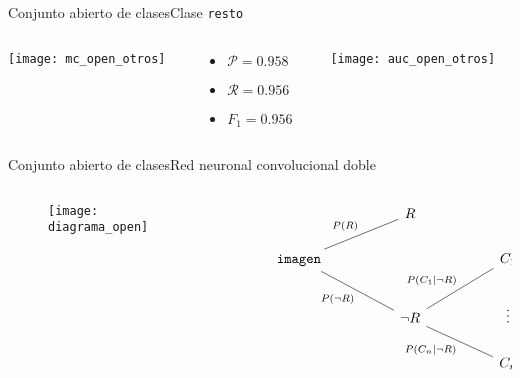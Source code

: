 \documentclass[aspectratio = 169]{beamer}
\begin{document}
			\begin{frame}{Conjunto abierto de clases}{Clase \texttt{resto}}
				\begin{columns}
					\begin{column}{.4\textwidth}
						\texttt{[image: mc\_open\_otros]}
					\end{column}
					\begin{column}{.2\textwidth}
						\begin{block}{}
							\begin{itemize}
								\item $\mathcal{P} = 0.958$
								\item $\mathcal{R} = 0.956$
								\item $F_1 = 0.956$
							\end{itemize}
						\end{block}
					\end{column}
					\begin{column}{.4\textwidth}
						\texttt{[image: auc\_open\_otros]}
					\end{column}
				\end{columns}
			\end{frame}
			\begin{frame}[fragile]{Conjunto abierto de clases}{Red neuronal convolucional doble}
				\vspace{-.5cm}
				\begin{columns}
					\begin{column}{.5\textwidth}
						\begin{figure}
							\hspace{-2.5cm}
							\texttt{[image: diagrama\_open]} 
							\label{fig:openset}
						\end{figure}
					\end{column}
					\begin{column}{.5\textwidth}
						\begin{figure}
							\centering
							$$
							\begin{tikzcd}[ampersand replacement=\&]
								\&  \& R                                                                                      \&  \&        \\
								\texttt{imagen} \arrow[rru, "P(R)", no head] \arrow[rrd, "P(\lnot R)"', no head] \&  \&                                                                                        \&  \& C_1    \\
								\&  \& \lnot R \arrow[rru, "P(C_1|\lnot R)", no head] \arrow[rrd, "P(C_n|\lnot R)"', no head] \&  \& \vdots \\
								\&  \&                                                                                        \&  \& C_n \\
							\end{tikzcd}
							$$
							\label{fig:prob}
						\end{figure}
					\end{column}
				\end{columns}
			\end{frame}
\end{document}
